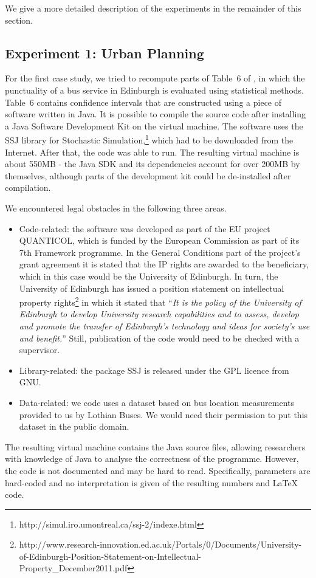 We give a more detailed description of the experiments in the remainder of this section.

\subsection*{Experiment 1: Urban Planning}

For the first case study, we tried to recompute parts of Table~6 of \cite{danielpaper}, in which the punctuality of a bus service in Edinburgh is evaluated using statistical methods. Table~6 contains confidence intervals that are constructed using a piece of software written in Java. It is possible to compile the source code after installing a Java Software Development Kit on the virtual machine. The software uses the SSJ library for Stochastic Simulation,\footnote{http://simul.iro.umontreal.ca/ssj-2/indexe.html} which had to be downloaded from the Internet. After that, the code was able to run.
The resulting virtual machine is about 550MB - the Java SDK and its dependencies account for over 200MB by themselves, although parts of the development kit could be de-installed after compilation.

We encountered legal obstacles in the following three areas.
\begin{itemize} 
\item Code-related: the software was developed as part of the EU project QUANTICOL, which is funded by the European Commission as part of its 7th Framework programme. In the General Conditions part of the project's grant agreement it is stated that the IP rights are awarded to the beneficiary, which in this case would be the University of Edinburgh. In turn, the University of Edinburgh has issued a position statement on intellectual property rights\footnote{http://www.research-innovation.ed.ac.uk/Portals/0/Documents/University-of-Edinburgh-Position-Statement-on-Intellectual-Property\_December2011.pdf} in which it stated that ``\emph{It is the policy of the University of Edinburgh to develop University research capabilities and to assess, develop and promote the transfer of Edinburgh's technology and ideas for society's use and benefit.}'' Still, publication of the code would need to be checked with a supervisor.
\item Library-related: the package SSJ is released under the GPL licence from GNU.
\item Data-related: we code uses a dataset based on bus location measurements provided to us by Lothian Buses. We would need their permission to put this dataset in the public domain.
\end{itemize}
The resulting virtual machine contains the Java source files, allowing researchers with knowledge of Java to analyse the correctness of the programme. However, the code is not documented and may be hard to read. Specifically, parameters are hard-coded and no interpretation is given of the resulting numbers and LaTeX code.

